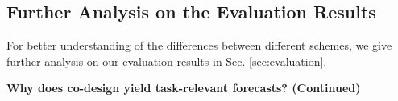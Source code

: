 

\subsection{Further Analysis on the Evaluation Results}
For better understanding of the differences between different schemes, we give further analysis on our evaluation results in Sec. \ref{sec:evaluation}.


\textbf{Why does co-design yield task-relevant forecasts? (Continued)}

